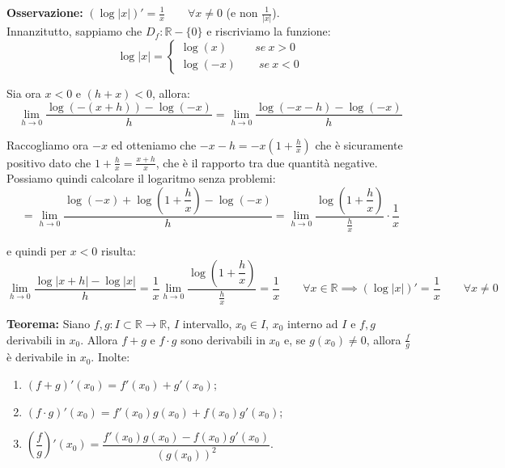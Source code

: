 \documentclass{article}
\begin{document}
\noindent\textbf{Osservazione:} $(\log|x|)' = \frac{1}{x} \qquad \forall x \neq 0$ (e non $\frac{1}{|x|}$).\\
Innanzitutto, sappiamo che $D_f: \mathbb{R} - \{0\}$ e riscriviamo la funzione:
\begin{equation*}
    \log|x| = \begin{cases}
        \log(x) \qquad \ \ se \ x > 0 \\
        \log(-x) \qquad se \ x < 0
    \end{cases}
\end{equation*}

\noindent Sia ora $x < 0$ e $(h + x) < 0$, allora:
\begin{equation*}
    \lim_{h \to 0} \frac{\log(-(x + h)) - \log(-x)}{h} = \lim_{h \to 0} \frac{\log(-x - h) - \log(-x)}{h}
\end{equation*}

\noindent Raccogliamo ora $-x$ ed otteniamo che $-x - h = -x(1 + \frac{h}{x})$ che è sicuramente positivo dato che $1 + \frac{h}{x} = \frac{x + h}{x}$, che è il rapporto tra due quantità negative. Possiamo quindi calcolare il logaritmo senza problemi:
\begin{equation*}
    = \lim_{h \to 0} \frac{\log(-x) + \log\left(1 + \dfrac{h}{x}\right) - \log(-x)}{h} = \lim_{h \to 0} \frac{\log\left(1 + \dfrac{h}{x}\right)}{\frac{h}{x}} \cdot \frac{1}{x} 
\end{equation*}

\noindent e quindi per $x < 0$ risulta:
\begin{equation*}
    \lim_{h \to 0} \frac{\log|x + h| - \log|x|}{h} = \frac{1}{x} \lim_{h \to 0} \frac{\log\left(1 + \dfrac{h}{x}\right)}{\frac{h}{x}} = \frac{1}{x} \qquad \forall x \in \mathbb{R} \implies (\log|x|)' = \frac{1}{x} \qquad \forall x \neq 0
\end{equation*}

\noindent\textbf{Teorema:} Siano $f, g: I \subset \mathbb{R} \xrightarrow{} \mathbb{R}$, $I$ intervallo, $x_0 \in I$, $x_0$ interno ad $I$ e $f, g$ derivabili in $x_0$. Allora $f + g$ e $f \cdot g$ sono derivabili in $x_0$ e, se $g(x_0) \neq 0$, allora $\frac{f}{g}$ è derivabile in $x_0$. Inolte:
\begin{enumerate}
    \item $(f + g)'(x_0) = f'(x_0) + g'(x_0)$;
    \item $(f \cdot g)'(x_0) = f'(x_0)g(x_0) + f(x_0)g'(x_0)$;
    \item $\left(\dfrac{f}{g}\right)'(x_0) = \dfrac{f'(x_0)g(x_0) - f(x_0)g'(x_0)}{(g(x_0))^2}$.
\end{enumerate}
\end{document}
